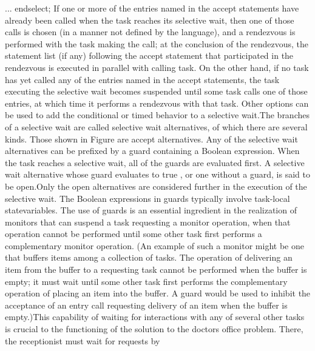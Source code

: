    ...
\tyxtstxbf[]end\tyxtstxendbf[] \tyxtstxbf[]select\tyxtstxendbf[];%
\Endcomp[]
\EndParbox[]
\FgEndblock[]
 If one or more of the entries named in the accept statements have
already been called when the task reaches its selective wait, then
one of those calls is chosen (in a manner not defined by the language),
and a rendezvous is performed with the task making the call; at the
conclusion of the rendezvous, the statement list (if any) following
the accept statement that participated in the rendezvous is executed
in parallel with calling task. On the other hand, if no task has yet
called any of the entries named in the accept statements, the task
executing the selective wait becomes suspended until some task calls
one of those entries, at which time it performs a rendezvous with
that task. Other options can be used to add the conditional or timed
behavior to a selective wait.\Endpara[]
\Para[]The branches of a selective wait are called \txtxemph[]selective
wait alternatives\txtxendemph[], of which there are several kinds.
Those shown in Figure 
are \txtxemph[]accept alternatives\txtxendemph[]. Any of the selective
wait alternatives can be prefixed by a \txtxemph[]guard%
\txtxendemph[] containing a Boolean expression. When the task reaches
a selective wait, all of the guards are evaluated first. A selective
wait alternative whose guard evaluates to \tyxffmxmono[]true%
\tyxffmxendmono[], or one without a guard, is said to be \ldquo[]open.\rdquo[]
Only the open alternatives are considered further in the execution
of the selective wait. The Boolean expressions in guards typically
involve task-local \ldquo[]state\rdquo[] variables. The use of guards
is an essential ingredient in the realization of monitors that can
suspend a task requesting a monitor operation, when that operation
cannot be performed until some other task first performs a complementary
monitor operation. (An example of such a monitor might be one that
buffers items among a collection of tasks. The operation of delivering
an item from the buffer to a requesting task cannot be performed when
the buffer is empty; it must wait until some other task first performs
the complementary operation of placing an item into the buffer. A
guard would be used to inhibit the acceptance of an entry call requesting
delivery of an item when the buffer is empty.)\Endpara[]
\Para[]This capability of waiting for interactions with any of several
other tasks is crucial to the functioning of the solution to the doctor\rsquo[]s
office problem. There, the receptionist must wait for requests by
